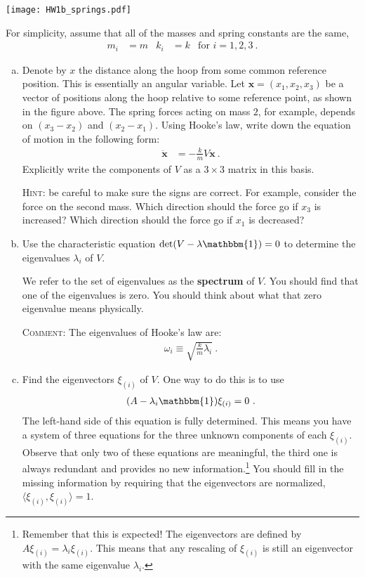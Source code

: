 \documentclass[12pt]{article}
\numberwithin{equation}{section}    %
\renewcommand{\vec}[1]{\mathbf{#1}} %
\begin{document}
\begin{center}
	\texttt{[image: HW1b\_springs.pdf]}
\end{center}

For simplicity, assume that all of the masses and spring constants are the same,
\begin{align}
	m_i &= m & k_i &= k 
	&
	\text{for } i=1,2,3 
	\ .
\end{align}

\begin{enumerate}[(a)]
	\item Denote by $x$ the distance along the hoop from some common reference position. This is essentially an angular variable. Let $\vec{x} = (x_1, x_2, x_3)$ be a vector of positions along the hoop relative to some reference point, as shown in the figure above. The spring forces acting on mass $2$, for example, depends on $(x_3-x_2)$ and $(x_2-x_1)$. Using Hooke's law, write down the equation of motion in the following form:
\begin{align}
	\ddot{\vec{x}} &= -\frac{k}{m} V \vec{x} \ .
	\label{eq:eom}
\end{align}
Explicitly write the components of $V$ as a $3\times 3$ matrix in this basis. 

\textsc{Hint:} be careful to make sure the signs are correct. For example, consider the force on the second mass. Which direction should the force go if $x_3$ is increased? Which direction should the force go if $x_1$ is decreased?

\item 
Use the characteristic equation $\text{det}(V-\lambda\mathbbm{1})=0$ to determine the eigenvalues $\lambda_i$ of $V$. 

We refer to the set of eigenvalues as the \textbf{spectrum} of $V$. You should find that one of the eigenvalues is zero. You should think about what that zero eigenvalue means physically.  

\textsc{Comment:} The eigenvalues of Hooke's law are: 
\begin{align}
	\omega_i \equiv \sqrt{\frac{k}{m}\lambda_i} \ .
\end{align}


\item Find the eigenvectors $\xi_{(i)}$ of $V$. One way to do this is to use
\begin{align}
 	(A-\lambda_i\mathbbm{1})\xi_{(i)} = 0 \ .
 \end{align}
The left-hand side of this equation is fully determined. This means you have a system of three equations for the three unknown components of each $\xi_{(i)}$. Observe that only two of these equations are meaningful, the third one is always redundant and provides no new information.\footnote{Remember that this is expected! The eigenvectors are defined by $A\xi_{(i)}=\lambda_i\xi_{(i)}$. This means that any rescaling of $\xi_{(i)}$ is still an eigenvector with the same eigenvalue $\lambda_i$.} You should fill in the missing information by requiring that the eigenvectors are normalized, $\langle \xi_{(i)}, \xi_{(i)} \rangle = 1$. 



\end{enumerate}
\end{document}
